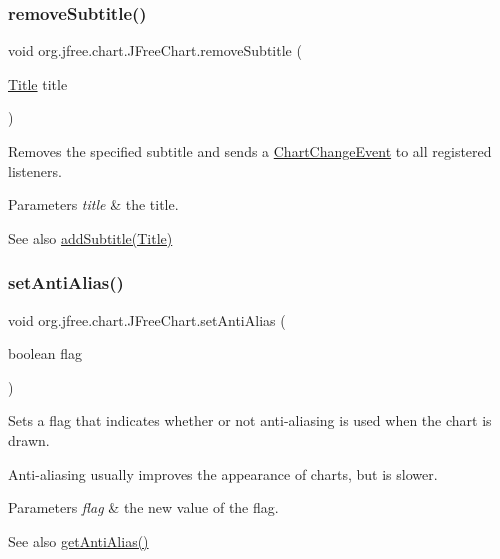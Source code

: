 \subsubsection{\texorpdfstring{remove\+Subtitle()}{removeSubtitle()}}
{\footnotesize\ttfamily void org.\+jfree.\+chart.\+J\+Free\+Chart.\+remove\+Subtitle (\begin{DoxyParamCaption}\item[{\mbox{\hyperlink{classorg_1_1jfree_1_1chart_1_1title_1_1_title}{Title}}}]{title }\end{DoxyParamCaption})}

Removes the specified subtitle and sends a \mbox{\hyperlink{}{Chart\+Change\+Event}} to all registered listeners.


\begin{DoxyParams}{Parameters}
{\em title} & the title.\\
\hline
\end{DoxyParams}
\begin{DoxySeeAlso}{See also}
\mbox{\hyperlink{classorg_1_1jfree_1_1chart_1_1_j_free_chart_a511d69d8b64444f31c59761a1c7ba8f8}{add\+Subtitle(\+Title)}} 
\end{DoxySeeAlso}
\mbox{\label{classorg_1_1jfree_1_1chart_1_1_j_free_chart_a31e3f57a186d4183037230520e97fc9d}} 
\subsubsection{\texorpdfstring{set\+Anti\+Alias()}{setAntiAlias()}}
{\footnotesize\ttfamily void org.\+jfree.\+chart.\+J\+Free\+Chart.\+set\+Anti\+Alias (\begin{DoxyParamCaption}\item[{boolean}]{flag }\end{DoxyParamCaption})}

Sets a flag that indicates whether or not anti-\/aliasing is used when the chart is drawn. 

Anti-\/aliasing usually improves the appearance of charts, but is slower.


\begin{DoxyParams}{Parameters}
{\em flag} & the new value of the flag.\\
\hline
\end{DoxyParams}
\begin{DoxySeeAlso}{See also}
\mbox{\hyperlink{classorg_1_1jfree_1_1chart_1_1_j_free_chart_a78d60bae89b02c231f4417d4da838dfc}{get\+Anti\+Alias()}} 
\end{DoxySeeAlso}
\mbox{\label{classorg_1_1jfree_1_1chart_1_1_j_free_chart_ab1a7deef8058f7f09b0e80c380bc2f68}} 
